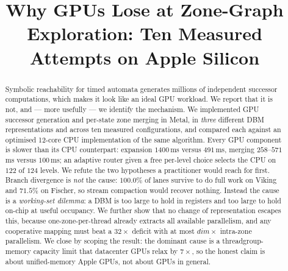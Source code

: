 \documentclass[11pt]{article}
\title{Why GPUs Lose at Zone-Graph Exploration: Ten Measured Attempts on Apple Silicon}
\author{}
\date{}
\begin{document}
\maketitle

\begin{abstract}
Symbolic reachability for timed automata generates millions of independent successor
computations, which makes it look like an ideal GPU workload. We report that it is not, and
--- more usefully --- we identify the mechanism. We implemented GPU successor generation and
per-state zone merging in Metal, in \emph{three} different DBM representations and across ten
measured configurations, and compared each against an optimised 12-core CPU implementation of
the same algorithm. Every GPU component is slower than its CPU counterpart: expansion
$1400$\,ms versus $491$\,ms, merging $258$--$571$\,ms versus $100$\,ms; an adaptive router
given a free per-level choice selects the CPU on $122$ of $124$ levels. We refute the two
hypotheses a practitioner would reach for first. Branch divergence is \emph{not} the cause:
$100.0\%$ of lanes survive to do full work on Viking and $71.5\%$ on Fischer, so stream
compaction would recover nothing. Instead the cause is a \emph{working-set dilemma}: a DBM is
too large to hold in registers and too large to hold on-chip at useful occupancy. We further
show that no change of representation escapes this, because one-zone-per-thread already
extracts all available parallelism, and any cooperative mapping must beat a $32\times$
deficit with at most $\mathit{dim}\times$ intra-zone parallelism. We close by scoping the
result: the dominant cause is a threadgroup-memory capacity limit that datacenter GPUs relax
by $7\times$, so the honest claim is about unified-memory Apple GPUs, not about GPUs in
general.
\end{abstract}







\end{document}
